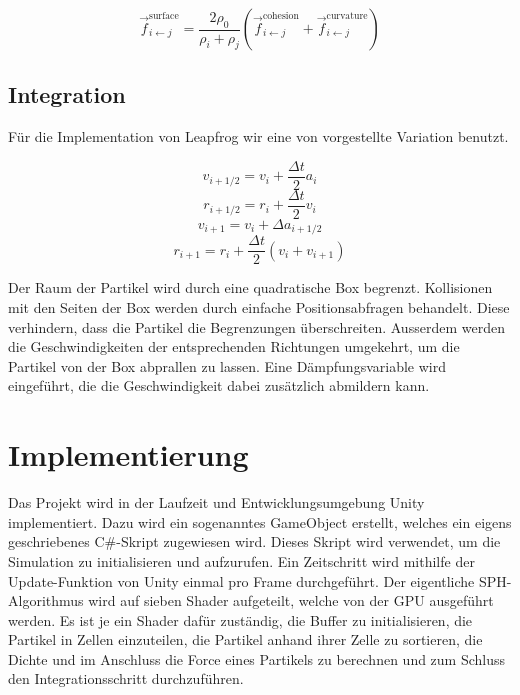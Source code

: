 \documentclass[a4paper]{paper}
\begin{document}
\begin{equation}
	\label{surface_tension}
	\vec{f}_{i\leftarrow j}^{\text{surface}} = \frac{2\rho_{0}}{\rho_{i}+\rho_{j}} (\vec{f}_{i\leftarrow j}^{\text{cohesion}} + \vec{f}_{i\leftarrow j}^{\text{curvature}})
\end{equation}


\subsection{Integration}


Für die Implementation von Leapfrog wir eine von \citep{Leapfrog} vorgestellte Variation benutzt.

\begin{equation}
\label{leapfrog_v_i+1/2}
v_{i+1/2} = v_{i}+\frac{\Delta t}{2}a_{i}
\end{equation}
\begin{equation}
\label{leapfrog_r_i+1/2}
r_{i+1/2} = r_{i}+\frac{\Delta t}{2}v_{i}
\end{equation}
\begin{equation}
\label{leapfrog_v_i+1}
v_{i+1} = v_{i} + \Delta a_{i+1/2}
\end{equation}
\begin{equation}
\label{leapfrog_r_i+1}
r_{i+1} = r_{i} + \frac{\Delta t}{2} (v_{i} + v_{i+1})
\end{equation}

Der Raum der Partikel wird durch eine quadratische Box begrenzt. Kollisionen mit den Seiten der Box werden durch einfache Positionsabfragen behandelt. Diese verhindern, dass die Partikel die Begrenzungen überschreiten. Ausserdem werden die Geschwindigkeiten der entsprechenden Richtungen umgekehrt, um die Partikel von der Box abprallen zu lassen. Eine Dämpfungsvariable wird eingeführt, die die Geschwindigkeit dabei zusätzlich abmildern kann.

\section{Implementierung}
Das Projekt wird in der Laufzeit und Entwicklungsumgebung Unity implementiert. Dazu wird ein sogenanntes GameObject erstellt, welches ein eigens geschriebenes C\#-Skript zugewiesen wird. Dieses Skript wird verwendet, um die Simulation zu initialisieren und aufzurufen. %
Ein Zeitschritt wird mithilfe der Update-Funktion von Unity einmal pro Frame durchgeführt. Der eigentliche SPH-Algorithmus wird auf sieben Shader aufgeteilt, welche von der GPU ausgeführt werden. Es ist je ein Shader dafür zuständig, die Buffer zu initialisieren, die Partikel in Zellen einzuteilen, die Partikel anhand ihrer Zelle zu sortieren, die Dichte und im Anschluss die Force eines Partikels zu berechnen und zum Schluss den Integrationsschritt durchzuführen.
\end{document}

